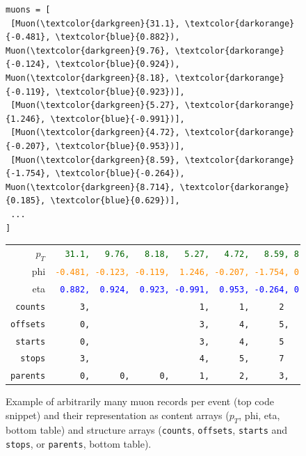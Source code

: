 \documentclass[a4paper]{jpconf}
\begin{document}
\begin{figure}
\begin{center}

\begin{minipage}{0.97\linewidth}
\small
\begin{Verbatim}[commandchars=\\\{\},frame=single]
muons = [
 [Muon(\textcolor{darkgreen}{31.1}, \textcolor{darkorange}{-0.481}, \textcolor{blue}{0.882}), Muon(\textcolor{darkgreen}{9.76}, \textcolor{darkorange}{-0.124}, \textcolor{blue}{0.924}), Muon(\textcolor{darkgreen}{8.18}, \textcolor{darkorange}{-0.119}, \textcolor{blue}{0.923})],
 [Muon(\textcolor{darkgreen}{5.27}, \textcolor{darkorange}{1.246}, \textcolor{blue}{-0.991})],
 [Muon(\textcolor{darkgreen}{4.72}, \textcolor{darkorange}{-0.207}, \textcolor{blue}{0.953})],
 [Muon(\textcolor{darkgreen}{8.59}, \textcolor{darkorange}{-1.754}, \textcolor{blue}{-0.264}), Muon(\textcolor{darkgreen}{8.714}, \textcolor{darkorange}{0.185}, \textcolor{blue}{0.629})],
 ...
]
\end{Verbatim}
\end{minipage}

\vspace{0.5 cm}
\renewcommand{\arraystretch}{1.25}
\begin{tabular}{| r | l |}
\hline
\mbox{\hspace{1 cm}$p_T$} & \textcolor{darkgreen}{\tt \ \ 31.1,\ \ \ 9.76,\ \ \ 8.18,\ \ \ 5.27,\ \ \ 4.72,\ \ \ 8.59, 8.714} \\
phi &  \textcolor{darkorange}{\tt -0.481,\ -0.123,\ -0.119,\ \ 1.246,\ -0.207,\ -1.754,\ 0.185} \\
eta &        \textcolor{blue}{\tt \ 0.882,\ \ 0.924,\ \ 0.923,\ -0.991,\ \ 0.953,\ -0.264,\ 0.629} \\\hline
{\tt counts}  & \tt \ \ \ \ \ 3,\ \ \ \ \ \ \ \ \ \ \ \ \ \ \ \ \ \ \ \ \ \ 1,\ \ \ \ \ \ 1,\ \ \ \ \ \ 2\ \ \ \ \ \ \ \ \ \\\hline
{\tt offsets} & \tt \ \ \ \ \ 0,\ \ \ \ \ \ \ \ \ \ \ \ \ \ \ \ \ \ \ \ \ \ 3,\ \ \ \ \ \ 4,\ \ \ \ \ \ 5,\ \ \ \ \ \ \ 7 \\\hline
{\tt starts}  & \tt \ \ \ \ \ 0,\ \ \ \ \ \ \ \ \ \ \ \ \ \ \ \ \ \ \ \ \ \ 3,\ \ \ \ \ \ 4,\ \ \ \ \ \ 5\ \ \ \ \ \ \ \ \ \\
{\tt stops}   & \tt \ \ \ \ \ 3,\ \ \ \ \ \ \ \ \ \ \ \ \ \ \ \ \ \ \ \ \ \ 4,\ \ \ \ \ \ 5,\ \ \ \ \ \ 7\ \ \ \ \ \ \ \ \ \\\hline
{\tt parents} & \tt \ \ \ \ \ 0,\ \ \ \ \ \ 0,\ \ \ \ \ \ 0,\ \ \ \ \ \ 1,\ \ \ \ \ \ 2,\ \ \ \ \ \ 3,\ \ \ \ \ 3 \\\hline
\end{tabular}

\end{center}

\caption{Example of arbitrarily many muon records per event (top code snippet) and their representation as content arrays ($p_T$, phi, eta, bottom table) and structure arrays ({\tt counts}, {\tt offsets}, {\tt starts} and {\tt stops}, or {\tt parents}, bottom table). \label{fig:muons}}
\end{figure}
\end{document}
